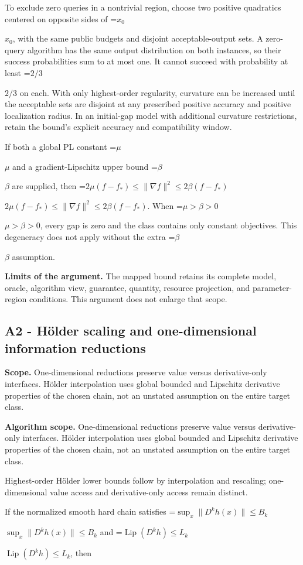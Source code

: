 \documentclass[10pt,a4paper]{article}
\newcommand{\AtlasMath}[1]{\par\begingroup\centering\setbox0=\hbox{$\displaystyle #1$}\ifdim\wd0>1.4\linewidth\typeout{ATLAS WIDE FORMULA: \the\wd0}\fi\ifdim\wd0>\linewidth\resizebox{\linewidth}{!}{\box0}\else\box0\fi\par\endgroup}
\newcommand{\AtlasInlineMath}[1]{\begingroup\setbox0=\hbox{$#1$}\ifdim\wd0>.4\linewidth\endgroup\AtlasMath{#1}\else\endgroup$#1$\fi}
\begin{document}
To exclude zero queries in a nontrivial region, choose two positive quadratics centered on opposite sides of \AtlasInlineMath{x_0}, with the same public budgets and disjoint acceptable-output sets. A zero-query algorithm has the same output distribution on both instances, so their success probabilities sum to at most one. It cannot succeed with probability at least \AtlasInlineMath{2/3} on each. With only highest-order regularity, curvature can be increased until the acceptable sets are disjoint at any prescribed positive accuracy and positive localization radius. In an initial-gap model with additional curvature restrictions, retain the bound's explicit accuracy and compatibility window.

If both a global PL constant \AtlasInlineMath{\mu} and a gradient-Lipschitz upper bound \AtlasInlineMath{\beta} are supplied, then \AtlasInlineMath{2\mu(f-f_*)\le\|\nabla f\|^2\le2\beta(f-f_*)}. When \AtlasInlineMath{\mu>\beta>0}, every gap is zero and the class contains only constant objectives. This degeneracy does not apply without the extra \AtlasInlineMath{\beta} assumption.

\textbf{Limits of the argument.} The mapped bound retains its complete model, oracle, algorithm view, guarantee, quantity, resource projection, and parameter-region conditions. This argument does not enlarge that scope.

\subsection{A2 - Hölder scaling and one-dimensional information reductions}
\textbf{Scope.} One-dimensional reductions preserve value versus derivative-only interfaces. Hölder interpolation uses global bounded and Lipschitz derivative properties of the chosen chain, not an unstated assumption on the entire target class.

\textbf{Algorithm scope.} One-dimensional reductions preserve value versus derivative-only interfaces. Hölder interpolation uses global bounded and Lipschitz derivative properties of the chosen chain, not an unstated assumption on the entire target class.

Highest-order Hölder lower bounds follow by interpolation and rescaling; one-dimensional value access and derivative-only access remain distinct.

If the normalized smooth hard chain satisfies \AtlasInlineMath{\sup_x\|D^kh(x)\|\le B_k} and \AtlasInlineMath{\operatorname{Lip}(D^kh)\le L_k}, then
\end{document}
